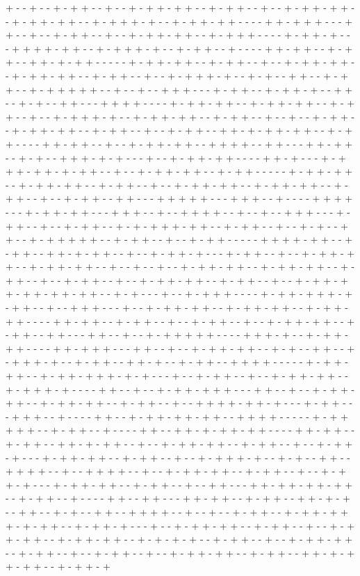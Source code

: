 + - - + - - + - + + - - + - - + - + + - + + - - + - + + - - + - - + - + + - + + - - + - + + - + + - - + - + + + - + - - + - + + - + + - - - - + + - + + + - - - + + - - + - - + - + + - - + - - + - + + - + + - - + - + + + - - - - + - + + - + - - - + + + + - + + - - + - + + + - + - - + - + + - - + - - - - + + - + + - - + - + + - - + + - + - + + - - - - - + - + + - + + - - + - + + - - + - - + - + + - + + - - + - + + - + + - - + - + + - - + - - + - + + + - + - - + - + - - + + - - + - + + - - + - + + + + + - - + - - + - - + + + - - - + - + + - - + - + + - + - - + + - - + - + - - + + - - - + + + + - - - - + - + + - + + - - + - + + - + + - - + - + + - - + - - + - + + + - + - - + - + + - + + - - + - + + - - + - - + - - + - + + - - + - + + - + + - - + - + + - - + - - + - + + - - + + - + - + + - + + - - + - + + - - - - + + - + + - - + - - + - + + - + + - - + + + + - - + + - - - + + - + + - - + - + - - + + + - + - + - - - + - - + - + + - + + - - - - + + - + - - - + - + + + - + + - + - + + - - + - - + - + + - + + - - + - + + - - - - - + - + + - + + - - + - + + - + + - - + - + + - - + - - + - + + - + + - - + - + + - + + - - + - + + - - + - - + - + + - - + + - - - + + + + + - - - + + + - - + - - - - + + + + - - - + - + + - + + - - - + + + - - + - - + + + + - - + - - + - - + + + - - - + - + + - - + - - + - + + - - + - + - + + + - + + - - + - + + - - + - - + - + - - + + - - + - + + + + + - - + - + + - - + - - + - + + - - - - - + + + + - + + - - + - + + - - + + - + - + + - - + - - + - + + - + - - - + - + + - - + - - + - + + - + + - - + - + + - + + - - + - - + - - + - - + - + + - + + - - + - + + - + + - - + - + + - - + - - + - + + - - + - - + - + + - + + - - + - + + - - + - - + - + + - + + - + + - + + - + + - - + - + - - - + - - + - + + + - - - - + - + + - + + + - + - + + - - + - - + + + - - - + - - + - + + - + + - - + - + + - + + - - + - + + - + + - - - - + + - + + - - + - + + - - + - - + - + + - - + - - + - + + - + + - - + - + + - - + + - - - + + - - + - - + - + + + + + - - - - + + + - + - - + - + + - + + - - - - + + - + + + - - - + + - - + - - + - + + - + + - - + - + - - + + - - + - + + + - + - - + - + + - - + + - + - - + - + + - - + + + + - - - - - + - + + - + + - - + - + + - + + + - + - + - - - + - - + - + + - - + - - + - + + - + + - - + - + + + - + - - - - + + - - + - - + - + + - + + + - - - + + - - + - - + - + + - + + - - + - + + - + + - - + - + + - - + - - + + + + - + + - + - - - + - + + - - - + + + - - + - - - - + + - - + - + + - + + - + + - - + + + + - - - - - + - + + + + + - - + - + + - - + - - - - + + - - + + - + - + + - + + - - - - + + - + + - - + - + + - - + + - + - + + - - + - - + - + + - + + - - + - + + - - + - - + - + + - + - - - + - + + - + + - - + - + + - - + - - + - + + + - + - - + - + - - + + - - + + + + - - + - - + + + + - - + - - + - + + - + + - - + - + + - - + - - + - + + - + - - - + - + + - + + - - + - + + - - + - - + + - - - + + - + + - + + - + + - - + - + + - - + - - - - + + - - + + - - - + + - + + - - + - + + - - + + - + - + - - + + - - + - + - - + + - - + + + + - - + - - + - - + - + + - - + - + + - + + + - + - + + - - + - + + - + - - - + - - + - + + - + + - - + - + + - - + - - + - + + - + + - - + - + + - + + - - + - + - + - + - - + - + + - - + - - + - + + - + + - - + - + + - - + - - + - + + - - + - - + - + + - + + - - + - + + - - + + - + - + + - + + - - + - + + - + 